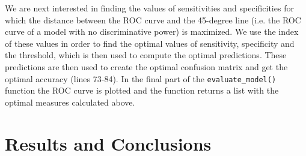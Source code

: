 \documentclass{article}
\begin{document}
We are next interested in finding the values of sensitivities and specificities for which the distance between the ROC curve and the 45-degree line (i.e. the ROC curve of a model with no discriminative power) is maximized. We use the index of these values in order to find the optimal values of sensitivity, specificity and the threshold, which is then used to compute the optimal predictions. These predictions are then used to create the optimal confusion matrix and get the optimal accuracy (lines 73-84). In the final part of the \texttt{evaluate\_model()} function the ROC curve is plotted and the function returns a list with the optimal measures calculated above.



\newpage
\section{Results and Conclusions}
\end{document}
